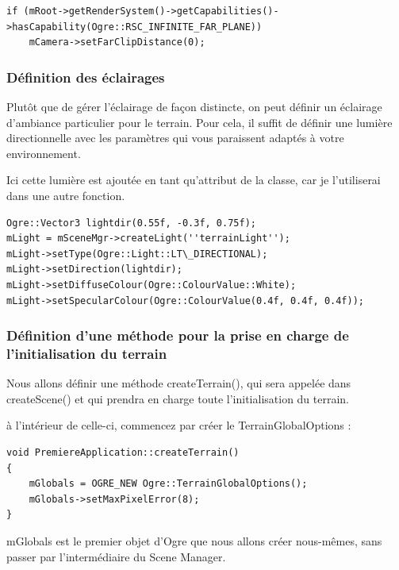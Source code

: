 \begin{lstlisting}[caption={Vérification et réglages de vue à l'infini}]
if (mRoot->getRenderSystem()->getCapabilities()->hasCapability(Ogre::RSC_INFINITE_FAR_PLANE))
    mCamera->setFarClipDistance(0);
\end{lstlisting}




\subsubsection{Définition des éclairages}
Plutôt que de gérer l'éclairage de fa\c{c}on distincte, on peut définir un éclairage d'ambiance particulier pour le terrain. Pour cela, il suffit de définir une lumière directionnelle avec les paramètres qui vous paraissent adaptés à votre environnement. 

Ici cette lumière est ajoutée en tant qu'attribut de la classe, car je l'utiliserai dans une autre fonction.

\begin{lstlisting}[caption={Définition de l'éclairage pour le terrain}]
Ogre::Vector3 lightdir(0.55f, -0.3f, 0.75f);
mLight = mSceneMgr->createLight(''terrainLight'');
mLight->setType(Ogre::Light::LT\_DIRECTIONAL);
mLight->setDirection(lightdir);
mLight->setDiffuseColour(Ogre::ColourValue::White);
mLight->setSpecularColour(Ogre::ColourValue(0.4f, 0.4f, 0.4f));
\end{lstlisting}




\subsubsection{Définition d'une méthode pour la prise en charge de l'initialisation du terrain}

Nous allons définir une méthode createTerrain(), qui sera appelée dans createScene() et qui prendra en charge toute l'initialisation du terrain.

à l'intérieur de celle-ci, commencez par créer le TerrainGlobalOptions :

\begin{lstlisting}[caption={Méthode pour la prise en charge de l'initialisation du terrain}]
void PremiereApplication::createTerrain()
{
    mGlobals = OGRE_NEW Ogre::TerrainGlobalOptions();
    mGlobals->setMaxPixelError(8);
}
\end{lstlisting}

mGlobals est le premier objet d'Ogre que nous allons créer nous-mêmes, sans passer par l'intermédiaire du Scene Manager.

